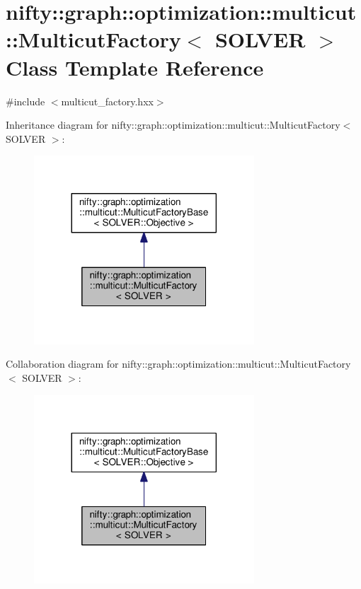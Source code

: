 \hypertarget{classnifty_1_1graph_1_1optimization_1_1multicut_1_1MulticutFactory}{}\section{nifty\+:\+:graph\+:\+:optimization\+:\+:multicut\+:\+:Multicut\+Factory$<$ S\+O\+L\+V\+E\+R $>$ Class Template Reference}
\label{classnifty_1_1graph_1_1optimization_1_1multicut_1_1MulticutFactory}


{\ttfamily \#include $<$multicut\+\_\+factory.\+hxx$>$}



Inheritance diagram for nifty\+:\+:graph\+:\+:optimization\+:\+:multicut\+:\+:Multicut\+Factory$<$ S\+O\+L\+V\+E\+R $>$\+:\nopagebreak
\begin{figure}[H]
\begin{center}
\leavevmode
\includegraphics[width=233pt]{classnifty_1_1graph_1_1optimization_1_1multicut_1_1MulticutFactory__inherit__graph}
\end{center}
\end{figure}


Collaboration diagram for nifty\+:\+:graph\+:\+:optimization\+:\+:multicut\+:\+:Multicut\+Factory$<$ S\+O\+L\+V\+E\+R $>$\+:\nopagebreak
\begin{figure}[H]
\begin{center}
\leavevmode
\includegraphics[width=233pt]{classnifty_1_1graph_1_1optimization_1_1multicut_1_1MulticutFactory__coll__graph}
\end{center}
\end{figure}

